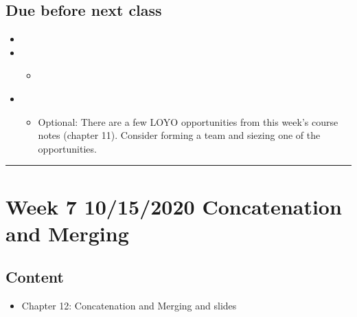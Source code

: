 \documentclass[letterpaper,10pt,english]{sphinxmanual}
\begin{document}
\subsection{Due before next class}
\label{\detokenize{course-schedule:id10}}\begin{itemize}
\item {} 

\item {} 
\begin{itemize}
\item {} 
{\hyperref[\detokenize{chapter-12-concat-and-merge::doc}]{}}

\end{itemize}

\item {} 
\begin{itemize}
\item {} 
Optional: There are a few LOYO opportunities from this week’s course notes (chapter 11).  Consider forming a team and siezing one of the opportunities.

\end{itemize}

\end{itemize}


\bigskip\hrule\bigskip



\section{Week 7 \sphinxhyphen{} 10/15/2020 \sphinxhyphen{} Concatenation and Merging}
\label{\detokenize{course-schedule:week-7-10-15-2020-concatenation-and-merging}}

\subsection{Content}
\label{\detokenize{course-schedule:id11}}\begin{itemize}
\item {} 
Chapter 12: Concatenation and Merging \sphinxhyphen{} {\hyperref[\detokenize{chapter-12-concat-and-merge::doc}]{}} and slides

\end{itemize}
\end{document}
